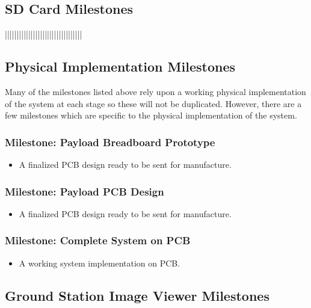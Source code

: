\subsection{SD Card Milestones}
|||||||||||||||||||||||||||||||||

\subsection{Physical Implementation Milestones}
Many of the milestones listed above rely upon a working physical implementation of the system at each stage
so these will not be duplicated. However, there are a few milestones which are specific to the physical implementation
of the system.



	\subsubsection{Milestone: Payload Breadboard Prototype}
		\label{sec:ms_phy_breadboard}
		\begin{itemize}
			\item A finalized PCB design ready to be sent for manufacture. 
		\end{itemize}

	\subsubsection{Milestone: Payload PCB Design}
		\label{sec:ms_phy_pcb_design}
		\begin{itemize}
			\item A finalized PCB design ready to be sent for manufacture. 
		\end{itemize}
		
	\subsubsection{Milestone: Complete System on PCB}
		\label{sec:ms_phy_pcb_complete}
		\begin{itemize}
			\item A working system implementation on PCB.
		\end{itemize}


\subsection{Ground Station Image Viewer Milestones}
